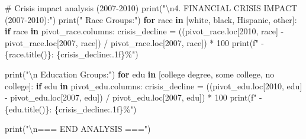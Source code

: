 \documentclass[
  letterpaper,
  DIV=11,
  numbers=noendperiod]{scrartcl}
\newenvironment{Shaded}{\begin{snugshade}}{\end{snugshade}}
\newcommand{\BuiltInTok}[1]{\textcolor[rgb]{0.00,0.23,0.31}{#1}}
\newcommand{\CharTok}[1]{\textcolor[rgb]{0.13,0.47,0.30}{#1}}
\newcommand{\CommentTok}[1]{\textcolor[rgb]{0.37,0.37,0.37}{#1}}
\newcommand{\ControlFlowTok}[1]{\textcolor[rgb]{0.00,0.23,0.31}{\textbf{#1}}}
\newcommand{\DecValTok}[1]{\textcolor[rgb]{0.68,0.00,0.00}{#1}}
\newcommand{\KeywordTok}[1]{\textcolor[rgb]{0.00,0.23,0.31}{\textbf{#1}}}
\newcommand{\NormalTok}[1]{\textcolor[rgb]{0.00,0.23,0.31}{#1}}
\newcommand{\OperatorTok}[1]{\textcolor[rgb]{0.37,0.37,0.37}{#1}}
\newcommand{\SpecialCharTok}[1]{\textcolor[rgb]{0.37,0.37,0.37}{#1}}
\newcommand{\SpecialStringTok}[1]{\textcolor[rgb]{0.13,0.47,0.30}{#1}}
\newcommand{\StringTok}[1]{\textcolor[rgb]{0.13,0.47,0.30}{#1}}
\begin{document}
\begin{Shaded}
\begin{Highlighting}[]
\CommentTok{\# Crisis impact analysis (2007{-}2010)}
\BuiltInTok{print}\NormalTok{(}\StringTok{"}\CharTok{\textbackslash{}n}\StringTok{4. FINANCIAL CRISIS IMPACT (2007{-}2010):"}\NormalTok{)}
\BuiltInTok{print}\NormalTok{(}\StringTok{"   Race Groups:"}\NormalTok{)}
\ControlFlowTok{for}\NormalTok{ race }\KeywordTok{in}\NormalTok{ [}\StringTok{\textquotesingle{}white\textquotesingle{}}\NormalTok{, }\StringTok{\textquotesingle{}black\textquotesingle{}}\NormalTok{, }\StringTok{\textquotesingle{}Hispanic\textquotesingle{}}\NormalTok{, }\StringTok{\textquotesingle{}other\textquotesingle{}}\NormalTok{]:}
    \ControlFlowTok{if}\NormalTok{ race }\KeywordTok{in}\NormalTok{ pivot\_race.columns:}
\NormalTok{        crisis\_decline }\OperatorTok{=}\NormalTok{ ((pivot\_race.loc[}\DecValTok{2010}\NormalTok{, race] }\OperatorTok{{-}}\NormalTok{ pivot\_race.loc[}\DecValTok{2007}\NormalTok{, race]) }\OperatorTok{/}\NormalTok{ pivot\_race.loc[}\DecValTok{2007}\NormalTok{, race]) }\OperatorTok{*} \DecValTok{100}
        \BuiltInTok{print}\NormalTok{(}\SpecialStringTok{f"   {-} }\SpecialCharTok{\{}\NormalTok{race}\SpecialCharTok{.}\NormalTok{title()}\SpecialCharTok{\}}\SpecialStringTok{: }\SpecialCharTok{\{}\NormalTok{crisis\_decline}\SpecialCharTok{:.1f\}}\SpecialStringTok{\%"}\NormalTok{)}

\BuiltInTok{print}\NormalTok{(}\StringTok{"}\CharTok{\textbackslash{}n}\StringTok{   Education Groups:"}\NormalTok{)}
\ControlFlowTok{for}\NormalTok{ edu }\KeywordTok{in}\NormalTok{ [}\StringTok{\textquotesingle{}college degree\textquotesingle{}}\NormalTok{, }\StringTok{\textquotesingle{}some college\textquotesingle{}}\NormalTok{, }\StringTok{\textquotesingle{}no college\textquotesingle{}}\NormalTok{]:}
    \ControlFlowTok{if}\NormalTok{ edu }\KeywordTok{in}\NormalTok{ pivot\_edu.columns:}
\NormalTok{        crisis\_decline }\OperatorTok{=}\NormalTok{ ((pivot\_edu.loc[}\DecValTok{2010}\NormalTok{, edu] }\OperatorTok{{-}}\NormalTok{ pivot\_edu.loc[}\DecValTok{2007}\NormalTok{, edu]) }\OperatorTok{/}\NormalTok{ pivot\_edu.loc[}\DecValTok{2007}\NormalTok{, edu]) }\OperatorTok{*} \DecValTok{100}
        \BuiltInTok{print}\NormalTok{(}\SpecialStringTok{f"   {-} }\SpecialCharTok{\{}\NormalTok{edu}\SpecialCharTok{.}\NormalTok{title()}\SpecialCharTok{\}}\SpecialStringTok{: }\SpecialCharTok{\{}\NormalTok{crisis\_decline}\SpecialCharTok{:.1f\}}\SpecialStringTok{\%"}\NormalTok{)}

\BuiltInTok{print}\NormalTok{(}\StringTok{"}\CharTok{\textbackslash{}n}\StringTok{=== END ANALYSIS ==="}\NormalTok{)  }
\end{Highlighting}
\end{Shaded}
\end{document}
